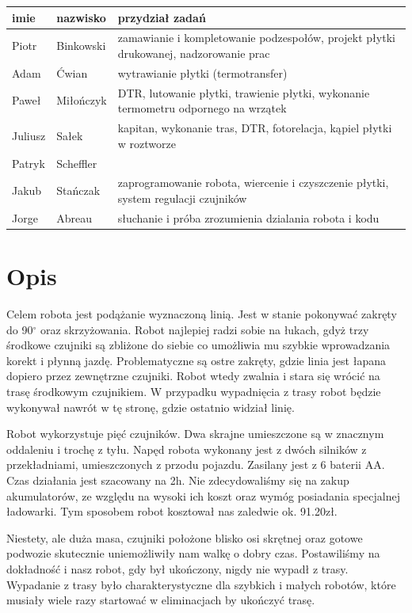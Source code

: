\documentclass[a4paper,11pt]{article}
\begin{document}
\begin{center}
	\begin{tabularx}{\textwidth}{|l|l|X|}
		\hline
		imie		& nazwisko		& przydział zadań \\ \hline
		Piotr	& Binkowski		& zamawianie i kompletowanie podzespołów, projekt płytki drukowanej, nadzorowanie prac			\\
		Adam		& Ćwian			& wytrawianie płytki (termotransfer)			\\
		Paweł	& Miłończyk		& DTR, lutowanie płytki, trawienie płytki, wykonanie termometru odpornego na wrzątek			\\
		Juliusz & Sałek			& kapitan, wykonanie tras, DTR, fotorelacja, kąpiel płytki w roztworze			\\
		Patryk	& Scheffler		&			\\
		Jakub	& Stańczak		& zaprogramowanie robota, wiercenie i czyszczenie płytki, system regulacji czujników			\\
		Jorge	& Abreau			& słuchanie i próba zrozumienia dzialania robota i kodu	\\ \hline
	\end{tabularx}
\end{center}

\tableofcontents

\listoffigures

\section{Opis}
Celem robota jest podążanie wyznaczoną linią. Jest w stanie pokonywać zakręty do 90$^\circ$ oraz skrzyżowania. Robot najlepiej radzi sobie na łukach, gdyż trzy środkowe czujniki są zbliżone do siebie co umożliwia mu szybkie wprowadzania korekt i płynną jazdę. Problematyczne są ostre zakręty, gdzie linia jest łapana dopiero przez zewnętrzne czujniki. Robot wtedy zwalnia i stara się wrócić na trasę środkowym czujnikiem. W przypadku wypadnięcia z trasy robot będzie wykonywał nawrót w tę stronę, gdzie ostatnio widział linię.

Robot wykorzystuje pięć czujników. Dwa skrajne umieszczone są w znacznym oddaleniu i trochę z tyłu.
Napęd robota wykonany jest z dwóch silników z przekładniami, umieszczonych z przodu pojazdu. Zasilany jest z 6 baterii AA. Czas działania jest szacowany na 2h. Nie zdecydowaliśmy się na zakup akumulatorów, ze względu na wysoki ich koszt oraz wymóg posiadania specjalnej ładowarki. Tym sposobem robot kosztował nas zaledwie ok. 91.20zł.

Niestety, ale duża masa, czujniki położone blisko osi skrętnej oraz gotowe podwozie skutecznie uniemożliwiły nam walkę o dobry czas. Postawiliśmy na dokładność i nasz robot, gdy był ukończony, nigdy nie wypadł z trasy. Wypadanie z trasy było charakterystyczne dla szybkich i małych robotów, które musiały wiele razy startować w eliminacjach by ukończyć trasę.
\end{document}
